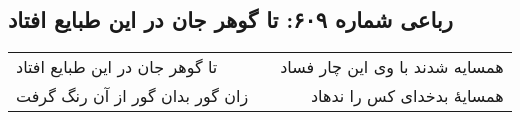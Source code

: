 \begin{center}
\section*{رباعی شماره ۶۰۹: تا گوهر جان در این طبایع افتاد}
\label{sec:0609}
\begin{longtable}{l p{0.5cm} r}
تا گوهر جان در این طبایع افتاد
&&
همسایه شدند با وی این چار فساد
\\
زان گور بدان گور از آن رنگ گرفت
&&
همسایهٔ بدخدای کس را ندهاد
\\
\end{longtable}
\end{center}

